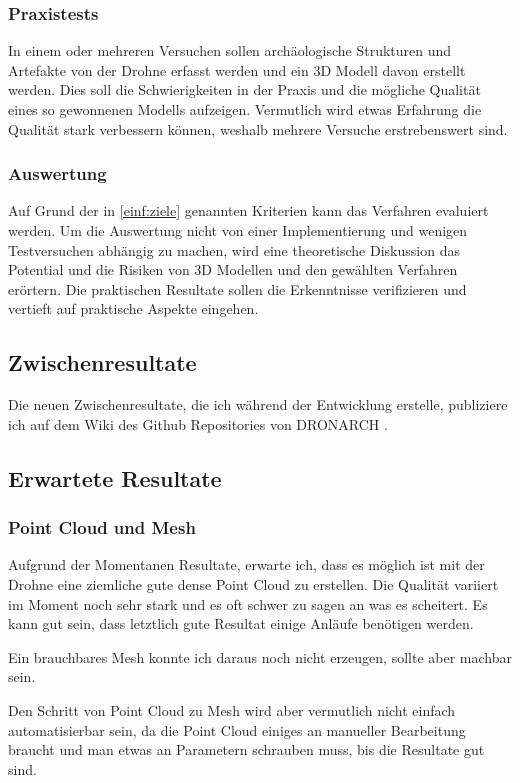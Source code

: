 \documentclass{paper}
\begin{document}
			\subsubsection{Praxistests}
				In einem oder mehreren Versuchen sollen archäologische Strukturen und Artefakte von der Drohne erfasst werden und ein 3D Modell davon erstellt werden.
				Dies soll die Schwierigkeiten in der Praxis und die mögliche Qualität eines so gewonnenen Modells aufzeigen.
				Vermutlich wird etwas Erfahrung die Qualität stark verbessern können, weshalb mehrere Versuche erstrebenswert sind.
			
			\subsubsection{Auswertung}
				Auf Grund der in \autoref{einf:ziele} genannten Kriterien kann das Verfahren evaluiert werden. Um die Auswertung nicht von einer Implementierung und wenigen Testversuchen abhängig zu machen, wird eine theoretische Diskussion das Potential und die Risiken von 3D Modellen und den gewählten Verfahren erörtern.
				Die praktischen Resultate sollen die Erkenntnisse verifizieren und vertieft auf praktische Aspekte eingehen.
		
		\subsection{Zwischenresultate}
			Die neuen Zwischenresultate, die ich während der Entwicklung erstelle, publiziere ich auf dem Wiki des Github Repositories von DRONARCH \cite{dronarch:github}.		

		\subsection{Erwartete Resultate}
			\subsubsection{Point Cloud und Mesh}
				Aufgrund der Momentanen Resultate, erwarte ich, dass es möglich ist mit der Drohne eine ziemliche gute dense Point Cloud zu erstellen.
				Die Qualität variiert im Moment noch sehr stark und es oft schwer zu sagen an was es scheitert.
				Es kann gut sein, dass letztlich gute Resultat einige Anläufe benötigen werden.
				
				Ein brauchbares Mesh konnte ich daraus noch nicht erzeugen, sollte aber machbar sein.
				
				Den Schritt von Point Cloud zu Mesh wird aber vermutlich nicht einfach automatisierbar sein, da die Point Cloud einiges an manueller Bearbeitung braucht und man etwas an Parametern schrauben muss, bis die Resultate gut sind.
			
\end{document}
